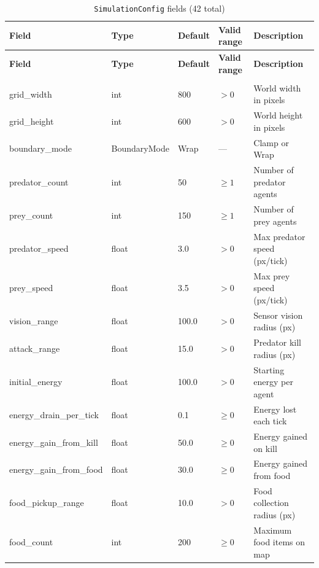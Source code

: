 \begin{longtable}[l]{@{}>{\ttfamily\small}p{5.8cm}>{\ttfamily\small\RaggedRight}p{2.2cm}p{0.7cm}p{1.0cm}p{3.3cm}@{}}
\caption{\texttt{SimulationConfig} fields (42 total)}
\label{tab:config}\\
\toprule
\textbf{Field} & \textbf{Type} & \textbf{Default} & \textbf{Valid range} & \textbf{Description} \\
\midrule
\endfirsthead
\toprule
\textbf{Field} & \textbf{Type} & \textbf{Default} & \textbf{Valid range} & \textbf{Description} \\
\midrule
\endhead
\midrule \multicolumn{5}{r}{\small(continued on next page)} \\
\endfoot
\bottomrule
\endlastfoot
grid\_width            & int    & 800    & $>0$          & World width in pixels \\
grid\_height           & int    & 600    & $>0$          & World height in pixels \\
boundary\_mode         & BoundaryMode & Wrap & —           & Clamp or Wrap \\
predator\_count        & int    & 50     & $\ge 1$       & Number of predator agents \\
prey\_count            & int    & 150    & $\ge 1$       & Number of prey agents \\
predator\_speed        & float  & 3.0    & $>0$          & Max predator speed (px/tick) \\
prey\_speed            & float  & 3.5    & $>0$          & Max prey speed (px/tick) \\
vision\_range          & float  & 100.0  & $>0$          & Sensor vision radius (px) \\
attack\_range          & float  & 15.0   & $>0$          & Predator kill radius (px) \\
initial\_energy        & float  & 100.0  & $>0$          & Starting energy per agent \\
energy\_drain\_per\_tick& float & 0.1    & $\ge 0$       & Energy lost each tick \\
energy\_gain\_from\_kill& float & 50.0   & $\ge 0$       & Energy gained on kill \\
energy\_gain\_from\_food& float & 30.0   & $\ge 0$       & Energy gained from food \\
food\_pickup\_range    & float  & 10.0   & $>0$          & Food collection radius (px) \\
food\_count            & int    & 200    & $\ge 0$       & Maximum food items on map \\

\end{longtable}
